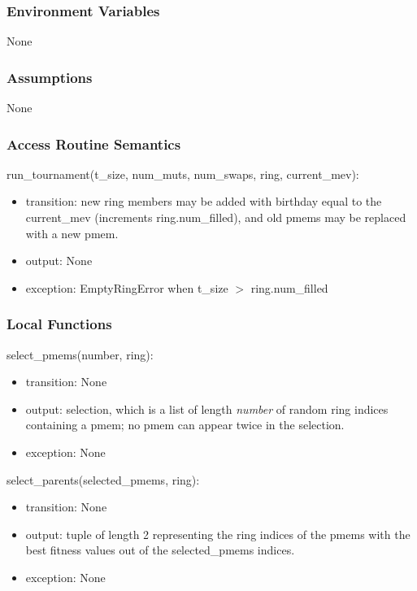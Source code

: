\documentclass[12pt, titlepage]{article}
\begin{document}
\subsubsection{Environment Variables}

None

\subsubsection{Assumptions}

None 

\subsubsection{Access Routine Semantics}

\noindent run\_tournament(t\_size, num\_muts, num\_swaps, ring, current\_mev):
\begin{itemize}
	\item transition: new ring members may be added with birthday equal to the 
	current\_mev (increments ring.num\_filled), and old pmems may be replaced 
	with a new pmem.
	\item output: None 
	\item exception: EmptyRingError when t\_size $>$ ring.num\_filled
\end{itemize}

\subsubsection{Local Functions}

\noindent select\_pmems(number, ring):
\begin{itemize}
	\item transition: None
	\item output: selection, which is a list of length \textit{number} of 
	random ring indices containing a pmem; no pmem can appear twice in the 
	selection.
	\item exception: None
\end{itemize}

\noindent select\_parents(selected\_pmems, ring):
\begin{itemize}
	\item transition: None
	\item output: tuple of length 2 representing the ring indices of the pmems 
	with the best fitness values out of the selected\_pmems indices.
	\item exception: None
\end{itemize}
\end{document}
